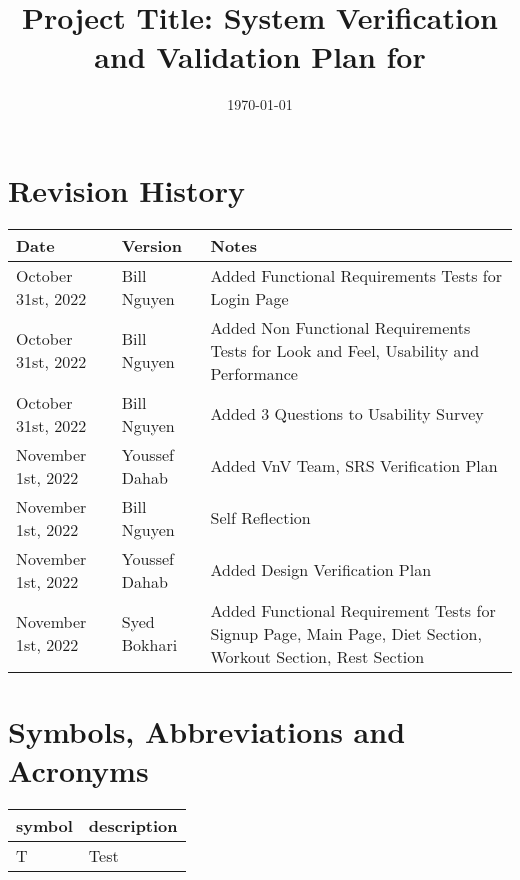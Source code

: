 \documentclass[12pt, titlepage]{article}
\begin{document}
\title{Project Title: System Verification and Validation Plan for \progname{}} 
\author{\authname}
\date{\today}

\maketitle


\section{Revision History}

\begin{tabularx}{\textwidth}{p{3cm}p{2cm}X}
	\toprule {\bf Date} & {\bf Version} & {\bf Notes}\\
	\midrule
	October 31st, 2022 & Bill Nguyen & Added Functional Requirements Tests for Login Page\\
	October 31st, 2022 & Bill Nguyen & Added Non Functional Requirements Tests for Look and Feel, Usability and Performance\\
	October 31st, 2022 & Bill Nguyen & Added 3 Questions to Usability Survey\\
	November 1st, 2022 & Youssef Dahab & Added VnV Team, SRS Verification Plan\\
	November 1st, 2022 & Bill Nguyen & Self Reflection\\
	November 1st, 2022 & Youssef Dahab & Added Design Verification Plan\\
	November 1st, 2022 & Syed Bokhari & Added Functional Requirement Tests for Signup Page, Main Page, Diet Section, Workout Section, Rest Section\\
	\bottomrule
\end{tabularx}

\newpage

\tableofcontents

\listoftables
{}

\listoffigures
{}

\newpage

\section{Symbols, Abbreviations and Acronyms}

\renewcommand{\arraystretch}{1.2}
\begin{tabular}{l l} 
	\toprule		
	\textbf{symbol} & \textbf{description}\\
	\midrule 
	T & Test\\
	\bottomrule
\end{tabular}\\
\end{document}
